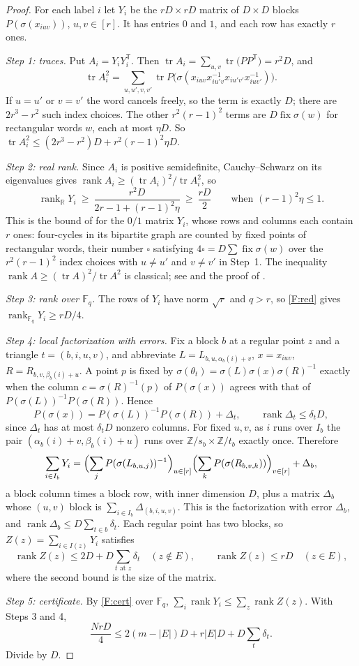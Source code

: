 \documentclass[11pt]{article}
\theoremstyle{definition}
\theoremstyle{remark}
\numberwithin{equation}{section}
\DeclareMathOperator{\rank}{rank}
\DeclareMathOperator{\tr}{tr}
\DeclareMathOperator{\fix}{fix}
\newcommand{\F}{\mathbb F}
\newcommand{\R}{\mathbb R}
\newcommand{\Z}{\mathbb Z}
\begin{document}
\begin{proof}
For each label $i$ let $Y_i$ be the $rD\times rD$ matrix of $D\times D$ blocks $P(\sigma(x_{iuv}))$, $u,v\in[r]$. It has entries $0$ and $1$, and each row has exactly $r$ ones.

\emph{Step 1: traces.} Put $A_i=Y_iY_i^{\mathsf T}$. Then $\tr A_i=\sum_{u,v}\tr\bigl(P P^{\mathsf T}\bigr)=r^2D$, and
\[
 \tr A_i^2=\sum_{u,u',v,v'}\tr P\bigl(\sigma(x_{iuv}x_{iu'v}^{-1}x_{iu'v'}x_{iuv'}^{-1})\bigr).
\]
If $u=u'$ or $v=v'$ the word cancels freely, so the term is exactly $D$; there are $2r^3-r^2$ such index choices. The other $r^2(r-1)^2$ terms are $D\fix\sigma(w)$ for rectangular words $w$, each at most $\eta D$. So $\tr A_i^2\le(2r^3-r^2)D+r^2(r-1)^2\eta D$.

\emph{Step 2: real rank.} Since $A_i$ is positive semidefinite, Cauchy--Schwarz on its eigenvalues gives $\rank A_i\ge(\tr A_i)^2/\tr A_i^2$, so
\[
 \rank_\R Y_i\ \ge\ \frac{r^2D}{2r-1+(r-1)^2\eta}\ \ge\ \frac{rD}{2}\qquad\text{when }(r-1)^2\eta\le1.
\]
This is the bound of \cite[Theorem~6]{AHKPY2011} for the $0/1$ matrix $Y_i$, whose rows and columns each contain $r$ ones: four-cycles in its bipartite graph are counted by fixed points of rectangular words, their number $\square$ satisfying $4\square=D\sum\fix\sigma(w)$ over the $r^2(r-1)^2$ index choices with $u\ne u'$ and $v\ne v'$ in Step~1. The inequality $\rank A\ge(\tr A)^2/\tr A^2$ is classical; see \cite[Section~3]{AHKPY2011} and the proof of \cite[Lemma~2.2]{Alon2009}.

\emph{Step 3: rank over $\F_q$.} The rows of $Y_i$ have norm $\sqrt r$ and $q>r$, so \ref{F:red} gives $\rank_{\F_q}Y_i\ge rD/4$.

\emph{Step 4: local factorization with errors.} Fix a block $b$ at a regular point $z$ and a triangle $t=(b,i,u,v)$, and abbreviate $L=L_{b,u,\alpha_b(i)+v}$, $x=x_{iuv}$, $R=R_{b,v,\beta_b(i)+u}$. A point $p$ is fixed by $\sigma(\theta_t)=\sigma(L)\sigma(x)\sigma(R)^{-1}$ exactly when the column $c=\sigma(R)^{-1}(p)$ of $P(\sigma(x))$ agrees with that of $P(\sigma(L))^{-1}P(\sigma(R))$. Hence
\[
 P(\sigma(x))=P(\sigma(L))^{-1}P(\sigma(R))+\Delta_t,\qquad \rank\Delta_t\le\delta_tD,
\]
since $\Delta_t$ has at most $\delta_tD$ nonzero columns. For fixed $u,v$, as $i$ runs over $I_b$ the pair $(\alpha_b(i)+v,\beta_b(i)+u)$ runs over $\Z/s_b\times\Z/t_b$ exactly once. Therefore
\[
 \sum_{i\in I_b}Y_i=\Bigl(\sum_{j}P(\sigma(L_{b,u,j}))^{-1}\Bigr)_{u\in[r]}\Bigl(\sum_kP(\sigma(R_{b,v,k}))\Bigr)_{v\in[r]}+\Delta_b,
\]
a block column times a block row, with inner dimension $D$, plus a matrix $\Delta_b$ whose $(u,v)$ block is $\sum_{i\in I_b}\Delta_{(b,i,u,v)}$. This is the factorization \cite[(2.11)]{OAI252} with error $\Delta_b$, and $\rank\Delta_b\le D\sum_{t\in b}\delta_t$. Each regular point has two blocks, so $Z(z)=\sum_{i\in I(z)}Y_i$ satisfies
\[
 \rank Z(z)\le 2D+D\sum_{t\text{ at }z}\delta_t\quad(z\notin E),\qquad \rank Z(z)\le rD\quad(z\in E),
\]
where the second bound is the size of the matrix.

\emph{Step 5: certificate.} By \ref{F:cert} over $\F_q$, $\sum_i\rank Y_i\le\sum_z\rank Z(z)$. With Steps 3 and 4,
\[
 \frac{NrD}{4}\le 2(m-|E|)D+r|E|D+D\sum_t\delta_t.
\]
Divide by $D$.
\end{proof}
\end{document}
